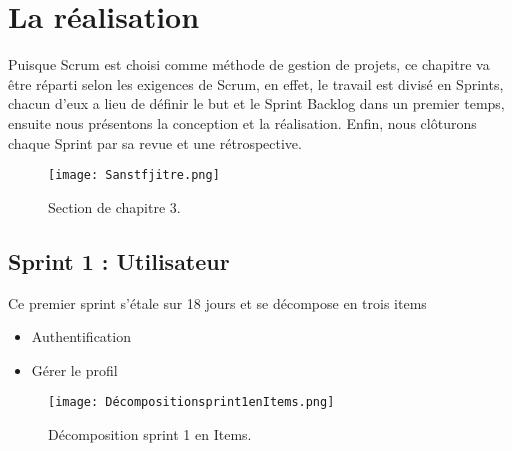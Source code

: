 \chapter{La réalisation }
\label{sec:conception}

\begin{fquote}Puisque Scrum est choisi comme méthode de gestion de projets, ce chapitre va être réparti selon
	les exigences de Scrum, en effet, le travail est divisé en Sprints, chacun d’eux a lieu de définir le but
	et le Sprint Backlog dans un premier temps, ensuite nous présentons la conception et la réalisation.
	Enfin, nous clôturons chaque Sprint par sa revue et une rétrospective.
 \end{fquote}
\begin{figure}[ht]
	\centering
	\texttt{[image: Sanstfjitre.png]}
	\caption{Section de chapitre 3.}
	\label{fig:Section de chapitre 3}
\end{figure}
\FloatBarrier
\clearpage

\section{Sprint 1 : Utilisateur }
\label{sec:conception}

\begin{fquote}
Ce premier sprint s’étale sur 18 jours et se décompose en trois items  \end{fquote}
\smallskip
\begin{itemize}[label=$\diamond$]
	\item Authentification
	\item Gérer le profil
\end{itemize}
\medskip
\medskip
\medskip
\medskip
\medskip
\medskip
\medskip
\medskip
\medskip
\medskip
\begin{figure}[ht]
	\centering
	\texttt{[image: Décompositionsprint1enItems.png]}
	\caption{Décomposition sprint 1 en Items.}
	\label{fig:Décomposition sprint 1 en Items}
\end{figure}
\FloatBarrier
\clearpage

